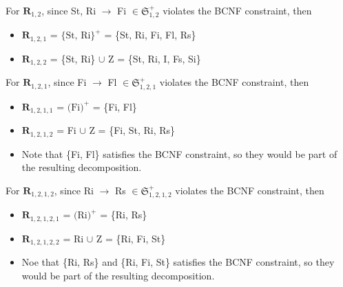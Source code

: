 \documentclass[12pt]{article}
\begin{document}
\begin{enumerate}
        For $\textbf{R}_{1,2}$, since St, Ri $\longrightarrow$ Fi $\in
        \mathfrak{S}_{1,2}^+$ violates the BCNF constraint, then
        \begin{itemize}
          \item $\textbf{R}_{1,2,1}$ = $\text{\{St, Ri\}}^+$
                                     = \{St, Ri, Fi, Fl, Rs\}
          \item $\textbf{R}_{1,2,2}$ = \{St, Ri\} $\cup$ Z
                                     = \{St, Ri, I, Fs, Si\}
        \end{itemize}

        For $\textbf{R}_{1,2,1}$, since Fi $\longrightarrow$ Fl $\in
        \mathfrak{S}_{1,2,1}^+$ violates the BCNF constraint, then
        \begin{itemize}
          \item $\textbf{R}_{1,2,1,1}$ = $\text{(Fi)}^+$
                                       = \{Fi, Fl\}
          \item $\textbf{R}_{1,2,1,2}$ = Fi $\cup$ Z
                                       = \{Fi, St, Ri, Rs\}
          \item Note that \{Fi, Fl\} satisfies the BCNF constraint, so they
                would be part of the resulting decomposition.
        \end{itemize}

        For $\textbf{R}_{1,2,1,2}$, since Ri $\longrightarrow$ Rs $\in
        \mathfrak{S}_{1,2,1,2}^+$ violates the BCNF constraint, then
        \begin{itemize}
          \item $\textbf{R}_{1,2,1,2,1}$ = $\text{(Ri)}^+$
                                         = \{Ri, Rs\}
          \item $\textbf{R}_{1,2,1,2,2}$ = Ri $\cup$ Z
                                         = \{Ri, Fi, St\}
          \item Noe that \{Ri, Rs\} and \{Ri, Fi, St\} satisfies the BCNF
                constraint, so they would be part of the resulting
                decomposition.
        \end{itemize}


\end{enumerate}
\end{document}
